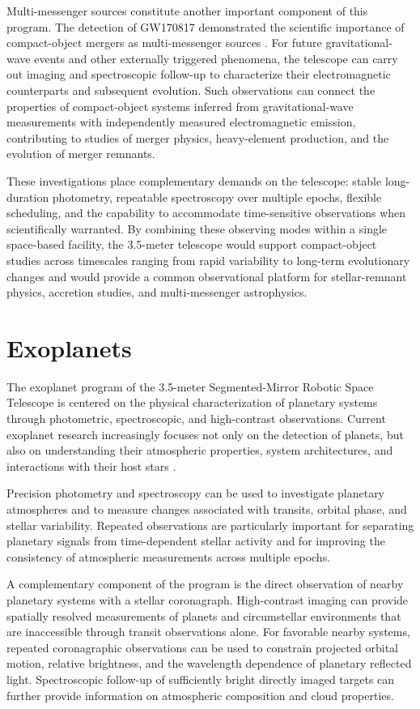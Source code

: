 Multi-messenger sources constitute another important component of this program.
The detection of GW170817 demonstrated the scientific importance of compact-object
mergers as multi-messenger sources \cite{abbott2017}. For future gravitational-wave
events and other externally triggered phenomena, the telescope can carry out imaging
and spectroscopic follow-up to characterize their electromagnetic counterparts and
subsequent evolution. Such observations can connect the properties of compact-object
systems inferred from gravitational-wave measurements with independently measured
electromagnetic emission, contributing to studies of merger physics, heavy-element
production, and the evolution of merger remnants.

These investigations place complementary demands on the telescope: stable long-duration photometry, repeatable spectroscopy over multiple epochs, flexible scheduling, and the capability to accommodate time-sensitive observations when scientifically warranted. By combining these observing modes within a single space-based facility, the 3.5-meter telescope would support compact-object studies across timescales ranging from rapid variability to long-term evolutionary changes and would provide a common observational platform for stellar-remnant physics, accretion studies, and multi-messenger astrophysics.

\section{Exoplanets}

The exoplanet program of the 3.5-meter Segmented-Mirror Robotic Space
Telescope is centered on the physical characterization of planetary systems
through photometric, spectroscopic, and high-contrast observations. Current
exoplanet research increasingly focuses not only on the detection of planets,
but also on understanding their atmospheric properties, system architectures,
and interactions with their host stars \cite{seager2013}.

Precision photometry and spectroscopy can be used to investigate planetary
atmospheres and to measure changes associated with transits, orbital phase,
and stellar variability. Repeated observations are particularly important
for separating planetary signals from time-dependent stellar activity and
for improving the consistency of atmospheric measurements across multiple
epochs.

A complementary component of the program is the direct observation of nearby
planetary systems with a stellar coronagraph. High-contrast imaging can
provide spatially resolved measurements of planets and circumstellar
environments that are inaccessible through transit observations alone.
For favorable nearby systems, repeated coronagraphic observations can be
used to constrain projected orbital motion, relative brightness, and the
wavelength dependence of planetary reflected light. Spectroscopic follow-up
of sufficiently bright directly imaged targets can further provide
information on atmospheric composition and cloud properties.

